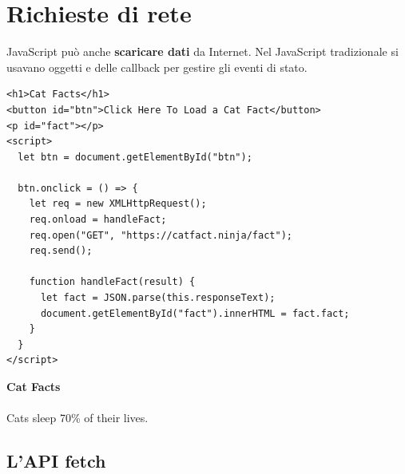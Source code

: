 
\section{Richieste di rete}

JavaScript può anche \textbf{scaricare dati} da Internet. Nel JavaScript
tradizionale si usavano oggetti  e delle callback per
gestire gli eventi di stato.

\begin{affianco}[0.6][c]
\codicepiccolo
\begin{lstlisting}[style=html, name=xhr.html]
<h1>Cat Facts</h1>
<button id="btn">Click Here To Load a Cat Fact</button>
<p id="fact"></p>
<script>
  let btn = document.getElementById("btn");

  btn.onclick = () => {
    let req = new XMLHttpRequest();
    req.onload = handleFact;
    req.open("GET", "https://catfact.ninja/fact");
    req.send();

    function handleFact(result) {
      let fact = JSON.parse(this.responseText);
      document.getElementById("fact").innerHTML = fact.fact;
    }
  }
</script>
\end{lstlisting}
\risultato
\begin{browser}
  {\Lora\bfseries\Huge Cat Facts}\\[6pt]
  \\[6pt]
  Cats sleep 70\% of their lives.
\end{browser}
\end{affianco}

\subsection{L'API fetch}


